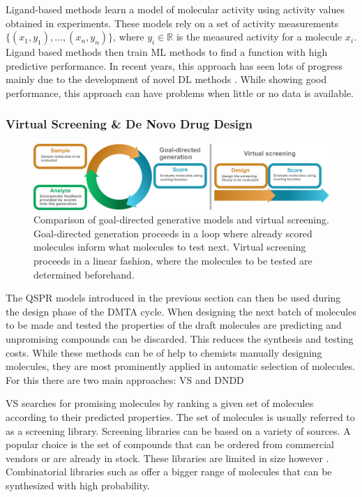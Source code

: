 Ligand-based methods learn a model of molecular activity using activity values obtained in experiments.
\newcommand{\reals}{\mathbb{R}}
These models rely on a set of activity measurements $\{(x_1, y_1), \dots, (x_n, y_n)\}$, where $y_i \in \reals$ is the measured 
activity for a molecule $x_i$. Ligand based methods then train \ac{ML} methods to find a function with high 
predictive performance. In recent years, this approach has seen lots of progress mainly  due to the 
development of novel \ac{DL} methods \citep{todo}. While showing good performance, this approach 
can have problems when little or no data is available. 

\subsubsection{Virtual Screening \& De Novo Drug Design}
\begin{figure}
    \centering
    \includegraphics[width=\textwidth]{./figures/goal_directed_cycle_and_virtual_screening.pdf}
    \caption{Comparison of goal-directed generative models and virtual screening.
    Goal-directed generation proceeds in a loop where already scored molecules 
    inform what molecules to test next. Virtual screening proceeds in a linear 
    fashion, where the molecules to be tested are determined beforehand. 
    }
\end{figure}
The \ac{QSPR} models introduced in the previous section can then be used during
the design phase of the DMTA cycle. When designing the next batch of molecules to be made and tested
the properties of the draft molecules are predicting and unpromising compounds can be discarded. 
This reduces the synthesis and testing costs. While these methods can be of help to chemists 
manually designing molecules, they are most prominently applied in automatic selection 
of molecules. For this there are two main approaches: \Ac{VS} and \ac{DNDD}

\Ac{VS} searches for promising molecules by ranking a given set of molecules according 
to their predicted properties. The set of molecules is usually referred to as a screening library.
Screening libraries can be based on a variety of sources. A popular choice is the set of compounds 
that can be ordered from commercial vendors or are already in stock. These libraries are limited 
in size however \citep{todo}. Combinatorial libraries such as \citep{todo} offer a bigger range of 
molecules that can be synthesized with high probability.




